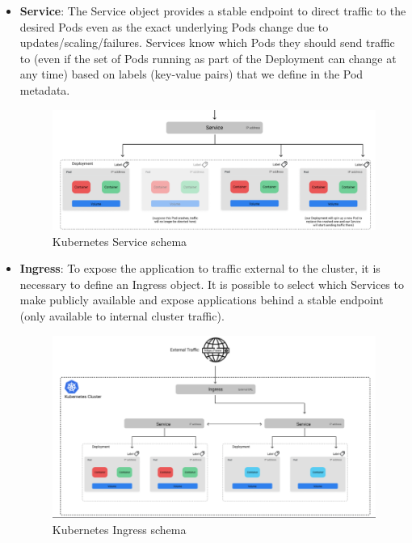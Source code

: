 \begin{itemize}
    \newpage
    \item \textbf{Service}: The Service object provides a stable endpoint to direct traffic to the desired Pods even as the exact underlying Pods change due to updates/scaling/failures. Services know which Pods they should send traffic to (even if the set of Pods running as part of the Deployment can change at any time) based on labels (key-value pairs) that we define in the Pod metadata.
    \begin{figure} [H]
        \centering
        \includegraphics[width=1\textwidth]{images/Cloud/K8sService.png}
        \caption{Kubernetes Service schema}
        \label{fig:K8sService}
    \end{figure}
	\item \textbf{Ingress}: To expose the application to traffic external to the cluster, it is necessary to define an Ingress object. It is possible to select which Services to make publicly available and expose applications behind a stable endpoint (only available to internal cluster traffic).
     \begin{figure} [H]
        \centering
        \includegraphics[width=1\textwidth]{images/Cloud/K8sIngress.png}
        \caption{Kubernetes Ingress schema}
        \label{fig:K8sIngress}
    \end{figure}
\end{itemize}

